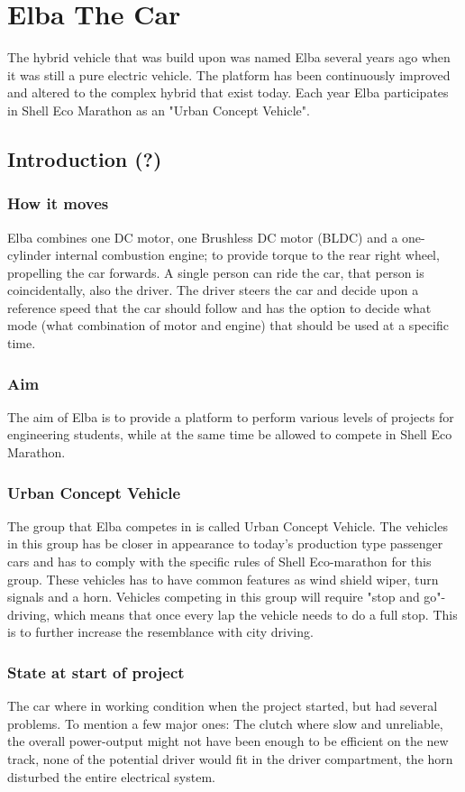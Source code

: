\chapter{Elba The Car}
The hybrid vehicle that was build upon was named Elba several years ago when it was still a pure electric vehicle. The platform has been continuously improved and altered to the complex hybrid that exist today. Each year Elba participates in Shell Eco Marathon as an "Urban Concept Vehicle".

\section{Introduction (?)}
\subsection{How it moves}
Elba combines one DC motor, one Brushless DC motor (BLDC) and a one-cylinder internal combustion engine; to provide torque to the rear right wheel, propelling the car forwards.
A single person can ride the car, that person is coincidentally, also the driver. 
The driver steers the car and decide upon a reference speed that the car should follow and has the option to decide what mode (what combination of motor and engine) that should be used at a specific time.

\subsection{Aim}
The aim of Elba is to provide a platform to perform various levels of projects for engineering students, while at the same time be allowed to compete in Shell Eco Marathon.

\subsection{Urban Concept Vehicle}
The group that Elba competes in is called Urban Concept Vehicle. The vehicles in this group has be closer in appearance to today's production type passenger cars and has to comply with the specific rules of Shell Eco-marathon for this group. These vehicles has to have common features as wind shield wiper, turn signals and a horn. Vehicles competing in this group will require "stop and go"-driving, which means that once every lap the vehicle needs to do a full stop. This is to further increase the resemblance with city driving.

\subsection{State at start of project}
The car where in working condition when the project started, but had several problems. To mention a few major ones: The clutch where slow and unreliable, the overall power-output might not have been enough to be efficient on the new track, none of the potential driver would fit in the driver compartment, the horn disturbed the entire electrical system.

